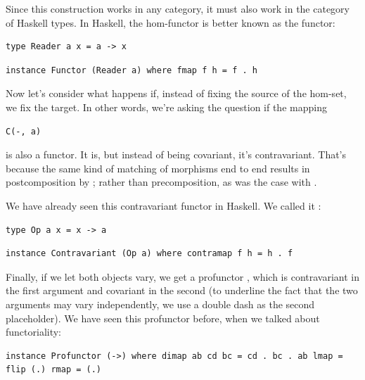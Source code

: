 Since this construction works in any category, it must also work in the
category of Haskell types. In Haskell, the hom-functor is better known
as the  functor:

\begin{Verbatim}[commandchars=\\\{\}]
type Reader a x = a -> x
\end{Verbatim}

\begin{Verbatim}[commandchars=\\\{\}]
instance Functor (Reader a) where fmap f h = f . h
\end{Verbatim}

Now let's consider what happens if, instead of fixing the source of the
hom-set, we fix the target. In other words, we're asking the question if
the mapping

\begin{Verbatim}[commandchars=\\\{\}]
C(-, a)
\end{Verbatim}

is also a functor. It is, but instead of being covariant, it's
contravariant. That's because the same kind of matching of morphisms end
to end results in postcomposition by ; rather than
precomposition, as was the case with .

We have already seen this contravariant functor in Haskell. We called it
:

\begin{Verbatim}[commandchars=\\\{\}]
type Op a x = x -> a
\end{Verbatim}

\begin{Verbatim}[commandchars=\\\{\}]
instance Contravariant (Op a) where contramap f h = h . f
\end{Verbatim}

Finally, if we let both objects vary, we get a profunctor
, which is contravariant in the first argument and
covariant in the second (to underline the fact that the two arguments
may vary independently, we use a double dash as the second placeholder).
We have seen this profunctor before, when we talked about functoriality:

\begin{Verbatim}[commandchars=\\\{\}]
instance Profunctor (->) where dimap ab cd bc = cd . bc . ab lmap = flip (.) rmap = (.)
\end{Verbatim}

